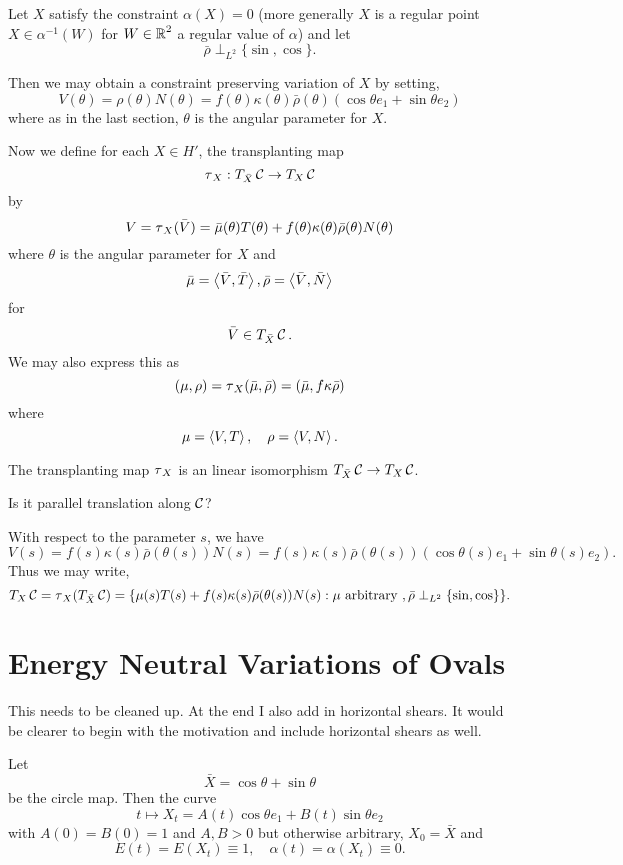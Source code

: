 \documentclass[12pt]{article}
\begin{document}
Let \(X\) satisfy the constraint \(\alpha(X) = 0\) (more generally \(X\) is a regular point \(X \in \alpha^{-1} (W)\) for \(W \in \operatorname{\mathbb{R}}^2\) a regular value of \(\alpha\)) and let
\[
\bar{\rho} \perp_{L^2} \{\sin, \cos\}.
\]

Then we may obtain a constraint preserving variation of \(X\) by setting,
\[
V(\theta) = \rho(\theta) N(\theta) = f(\theta) \kappa(\theta) \bar{\rho}(\theta) (\cos\theta e_1 + \sin\theta e_2)
\]
where as in the last section, \(\theta\) is the angular parameter for \(X\).

Now we define for each \(X \in H'\), the transplanting map
\[
\operatorname{\tau}_X : T_{\bar{X}} \operatorname{\mathcal{C}} \to T_X \operatorname{\mathcal{C}}
\]
by
\[
V = \operatorname{\tau}_X(\bar{V}) = \bar{\mu}(\theta) T(\theta) + f(\theta)\kappa(\theta)\bar{\rho}(\theta) N(\theta)
\]
where \(\theta\) is the angular parameter for \(X\) and
\[
\bar{\mu} = \left\langle{\bar{V}},{\bar{T}}\right\rangle, \bar{\rho} = \left\langle{\bar{V}},{\bar{N}}\right\rangle
\]
for
\[
\bar{V} \in T_{\bar{X}} \operatorname{\mathcal{C}}.
\]
We may also express this as
\[
(\mu, \rho) = \operatorname{\tau}_X(\bar{\mu}, \bar{\rho}) = (\bar{\mu}, f\kappa\bar{\rho})
\]
where
\[
\mu = \left\langle{V},{T}\right\rangle, \quad \rho = \left\langle{V},{N}\right\rangle.
\]

The transplanting map \(\operatorname{\tau}_X\) is an linear isomorphism \(T_{\bar{X}} \operatorname{\mathcal{C}} \to T_X \operatorname{\mathcal{C}}\).

{\color{red} Is it parallel translation along \(\operatorname{\mathcal{C}}\)?}

With respect to the parameter \(s\), we have
\[
V(s) = f(s) \kappa(s) \bar{\rho}(\theta(s)) N(s) = f(s) \kappa(s) \bar{\rho}(\theta(s))(\cos\theta(s) e_1 + \sin\theta(s) e_2).
\]
Thus we may write,
\[
T_X \operatorname{\mathcal{C}} = \operatorname{\tau}_X(T_{\bar{X}} \operatorname{\mathcal{C}}) = \{\mu(s) T(s) + f(s) \kappa(s) \bar{\rho}(\theta(s)) N(s) : \mu \text{ arbitrary }, \bar{\rho} \perp_{L^2} \{\sin, \cos\}\}.
\]

\section{Energy Neutral Variations of Ovals}

{\color{red} This needs to be cleaned up. At the end I also add in horizontal shears. It would be clearer to begin with the motivation and include horizontal shears as well.}

Let
\[
\bar{X} = \cos\theta + \sin \theta
\]
be the circle map. Then the curve
\[
t \mapsto X_t = A(t) \cos\theta e_1 + B(t) \sin \theta e_2
\]
with \(A(0) = B(0) = 1\) and \(A, B > 0\) but otherwise arbitrary, \(X_0 = \bar{X}\) and
\[
E(t) = E(X_t) \equiv 1, \quad \alpha(t) = \alpha(X_t) \equiv 0.
\]
\end{document}
